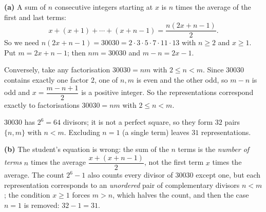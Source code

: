 \textbf{(a)} A sum of $n$ consecutive integers starting at $x$ is $n$ times the average of the first and last terms:
\[x+(x+1)+\cdots+(x+n-1)=\dfrac{n(2x+n-1)}{2}.\]
So we need $n(2x+n-1)=30030=2\cdot3\cdot5\cdot7\cdot11\cdot13$ with $n\ge2$ and $x\ge1$. Put $m=2x+n-1$; then $nm=30030$ and $m-n=2x-1$.

Conversely, take any factorisation $30030=nm$ with $2\le n<m$. Since $30030$ contains exactly one factor $2$, one of $n,m$ is even and the other odd, so $m-n$ is odd and $x=\dfrac{m-n+1}{2}$ is a positive integer. So the representations correspond exactly to factorisations $30030=nm$ with $2\le n<m$.

$30030$ has $2^6=64$ divisors; it is not a perfect square, so they form $32$ pairs $\{n,m\}$ with $n<m$. Excluding $n=1$ (a single term) leaves $\boxed{31}$ representations.

\textbf{(b)} The student's equation is wrong: the sum of the $n$ terms is the \emph{number of terms} $n$ times the average $\dfrac{x+(x+n-1)}{2}$, not the first term $x$ times the average. The count $2^6-1$ also counts every divisor of $30030$ except one, but each representation corresponds to an \emph{unordered} pair of complementary divisors $n<m$; the condition $x\ge1$ forces $m>n$, which halves the count, and then the case $n=1$ is removed: $32-1=31$.
